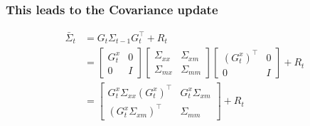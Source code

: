 \begin{frame}
    \frametitle{This leads to the Covariance update}

    \begin{align*}
        \bar{\Sigma}_t &= G_t \Sigma_{t-1} G_t^{\top} + R_t \\
        &= 
        \begin{bmatrix}
        G_t^x & 0 \\
        0 & I
        \end{bmatrix}
        \begin{bmatrix}
        \Sigma_{xx} & \Sigma_{xm} \\
        \Sigma_{mx} & \Sigma_{mm}
        \end{bmatrix}
        \begin{bmatrix}
        (G_t^x)^{\top} & 0 \\
        0 & I
        \end{bmatrix}
        + R_t \\
        &=
        \begin{bmatrix}
        G_t^x \Sigma_{xx} (G_t^x)^{\top} & G_t^x \Sigma_{xm} \\
        (G_t^x \Sigma_{xm})^{\top} & \Sigma_{mm}
        \end{bmatrix}
        + R_t
    \end{align*}

\end{frame}

